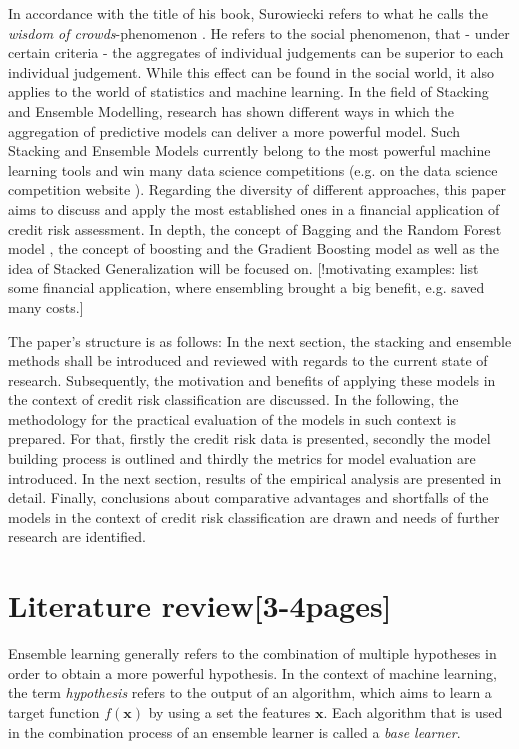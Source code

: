 \documentclass[12pt]{article}
\begin{document}
In accordance with the title of his book, Surowiecki refers to what he calls the \textit{wisdom of crowds}-phenomenon \cite{surowiecki2005wisdom}. He refers to the social phenomenon, that - under certain criteria - the aggregates of individual judgements can be superior to each individual judgement. While this effect can be found in the social world, it also applies to the world of statistics and machine learning. In the field of Stacking and Ensemble Modelling, research has shown different ways in which the aggregation of predictive models can deliver a more powerful model. Such Stacking and Ensemble Models currently belong to the most powerful machine learning tools and win many data science competitions (e.g. on the data science competition website \citeauthor{kaggle}). Regarding the diversity of different approaches, this paper aims to discuss and apply the most established ones in a financial application of credit risk assessment. In depth, the concept of Bagging and the Random Forest model \citep{breiman1996bagging, breiman2001random}, the concept of boosting and the Gradient Boosting model \cite{freund1996experiments, friedman2002stochastic} as well as the idea of Stacked Generalization \citep{wolpert1992stacked} will be focused on. [!motivating examples: list some financial application, where ensembling brought a big benefit, e.g. saved many costs.]

The paper's structure is as follows: In the next section, the stacking and ensemble methods shall be introduced and reviewed with regards to the current state of research. Subsequently, the motivation and benefits of applying these models in the context of credit risk classification are discussed. In the following, the methodology for the practical evaluation of the models in such context is prepared.  For that, firstly the credit risk data is presented, secondly the model building process is outlined and thirdly the metrics for model evaluation are introduced. In the next section, results of the empirical analysis are presented in detail. Finally, conclusions about comparative advantages and shortfalls of the models in the context of credit risk classification are drawn and needs of further research are identified.


\section{Literature review[3-4pages]}
Ensemble learning generally refers to the combination of multiple hypotheses in order to obtain a more powerful hypothesis. In the context of machine learning, the term \textit{hypothesis} refers to the output of an algorithm, which aims to learn a target function $f(\mathbf{x})$ by using a set the features $\mathbf{x}$. Each algorithm that is used in the combination process of an ensemble learner is called a \textit{base learner}.
\end{document}
